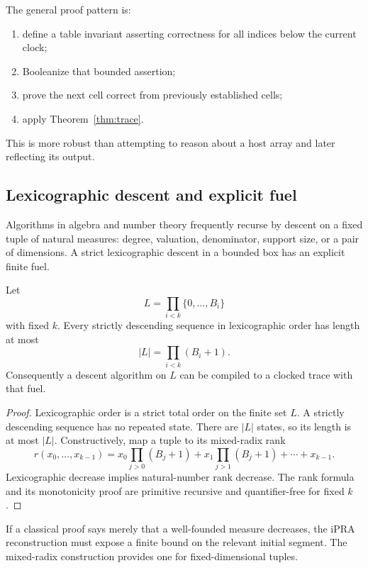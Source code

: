 The general proof pattern is:
\begin{enumerate}
\item define a table invariant asserting correctness for all indices below the
current clock;
\item Booleanize that bounded assertion;
\item prove the next cell correct from previously established cells;
\item apply Theorem~\ref{thm:trace}.
\end{enumerate}
This is more robust than attempting to reason about a host array and later
reflecting its output.

\subsection{Lexicographic descent and explicit fuel}

Algorithms in algebra and number theory frequently recurse by descent on a
fixed tuple of natural measures: degree, valuation, denominator, support size,
or a pair of dimensions.  A strict lexicographic descent in a bounded box has an
explicit finite fuel.

\begin{theorem}\label{thm:lexfuel}
Let
\[
  L=\prod_{i<k}\{0,\ldots,B_i\}
\]
with fixed \(k\).  Every strictly descending sequence in lexicographic order
has length at most
\[
       |L|=\prod_{i<k}(B_i+1).
\]
Consequently a descent algorithm on \(L\) can be compiled to a clocked trace
with that fuel.
\end{theorem}

\begin{proof}
Lexicographic order is a strict total order on the finite set \(L\).  A strictly
descending sequence has no repeated state.  There are \(|L|\) states, so its
length is at most \(|L|\).  Constructively, map a tuple to its mixed-radix rank
\[
 r(x_0,\ldots,x_{k-1})
   =x_0\prod_{j>0}(B_j+1)+x_1\prod_{j>1}(B_j+1)+\cdots+x_{k-1}.
\]
Lexicographic decrease implies natural-number rank decrease.  The rank formula
and its monotonicity proof are primitive recursive and quantifier-free for fixed
\(k\).
\end{proof}

If a classical proof says merely that a well-founded measure decreases, the
iPRA reconstruction must expose a finite bound on the relevant initial segment.
The mixed-radix construction provides one for fixed-dimensional tuples.

